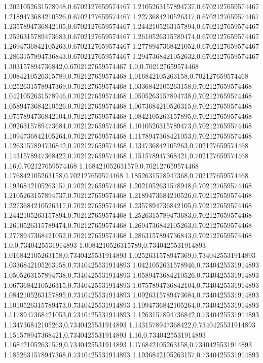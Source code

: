 1.2021052631578948,0.6702127659574467
1.2105263157894737,0.6702127659574467
1.2189473684210526,0.6702127659574467
1.2273684210526317,0.6702127659574467
1.2357894736842105,0.6702127659574467
1.2442105263157894,0.6702127659574467
1.2526315789473683,0.6702127659574467
1.2610526315789474,0.6702127659574467
1.2694736842105263,0.6702127659574467
1.2778947368421052,0.6702127659574467
1.2863157894736843,0.6702127659574467
1.2947368421052632,0.6702127659574467
1.303157894736842,0.6702127659574467
1.0,0.702127659574468
1.0084210526315789,0.702127659574468
1.016842105263158,0.702127659574468
1.0252631578947369,0.702127659574468
1.0336842105263158,0.702127659574468
1.0421052631578946,0.702127659574468
1.0505263157894738,0.702127659574468
1.0589473684210526,0.702127659574468
1.0673684210526315,0.702127659574468
1.0757894736842104,0.702127659574468
1.0842105263157895,0.702127659574468
1.0926315789473684,0.702127659574468
1.1010526315789473,0.702127659574468
1.1094736842105264,0.702127659574468
1.1178947368421053,0.702127659574468
1.1263157894736842,0.702127659574468
1.134736842105263,0.702127659574468
1.1431578947368422,0.702127659574468
1.151578947368421,0.702127659574468
1.16,0.702127659574468
1.168421052631579,0.702127659574468
1.176842105263158,0.702127659574468
1.1852631578947368,0.702127659574468
1.1936842105263157,0.702127659574468
1.2021052631578948,0.702127659574468
1.2105263157894737,0.702127659574468
1.2189473684210526,0.702127659574468
1.2273684210526317,0.702127659574468
1.2357894736842105,0.702127659574468
1.2442105263157894,0.702127659574468
1.2526315789473683,0.702127659574468
1.2610526315789474,0.702127659574468
1.2694736842105263,0.702127659574468
1.2778947368421052,0.702127659574468
1.2863157894736843,0.702127659574468
1.0,0.7340425531914893
1.0084210526315789,0.7340425531914893
1.016842105263158,0.7340425531914893
1.0252631578947369,0.7340425531914893
1.0336842105263158,0.7340425531914893
1.0421052631578946,0.7340425531914893
1.0505263157894738,0.7340425531914893
1.0589473684210526,0.7340425531914893
1.0673684210526315,0.7340425531914893
1.0757894736842104,0.7340425531914893
1.0842105263157895,0.7340425531914893
1.0926315789473684,0.7340425531914893
1.1010526315789473,0.7340425531914893
1.1094736842105264,0.7340425531914893
1.1178947368421053,0.7340425531914893
1.1263157894736842,0.7340425531914893
1.134736842105263,0.7340425531914893
1.1431578947368422,0.7340425531914893
1.151578947368421,0.7340425531914893
1.16,0.7340425531914893
1.168421052631579,0.7340425531914893
1.176842105263158,0.7340425531914893
1.1852631578947368,0.7340425531914893
1.1936842105263157,0.7340425531914893
